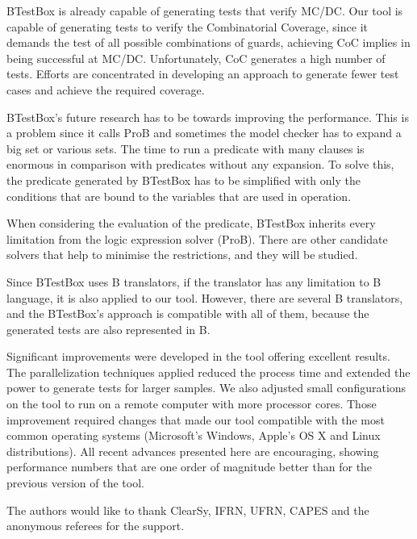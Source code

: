 \documentclass[runningheads]{llncs}
\begin{document}
BTestBox is already capable of generating tests that verify MC/DC. Our tool is capable of generating tests to verify the Combinatorial Coverage, since it demands the test of all possible combinations of guards, achieving CoC implies in being successful at MC/DC. Unfortunately, CoC generates a high number of tests. Efforts are concentrated in developing an approach to generate fewer test cases and achieve the required coverage.

BTestBox's future research has to be towards improving the performance. This is a problem since it calls ProB and sometimes the model checker has to expand a big set or various sets. The time to run a predicate with many clauses is enormous in comparison with predicates without any expansion. To solve this, the predicate generated by BTestBox has to be simplified with only the conditions that are bound to the variables that are used in operation.

When considering the evaluation of the predicate, BTestBox inherits every limitation from the logic expression solver (ProB). There are other candidate solvers that help to minimise the restrictions, and they will be studied.

Since BTestBox uses B translators, if the translator has any limitation to B language, it is also applied to our tool. However, there are several B translators, and the BTestBox's approach is compatible with all of them, because the generated tests are also represented in B. 

Significant improvements were developed in the tool offering excellent results.
The parallelization techniques applied reduced the process time and extended the power to generate tests for larger samples. We also adjusted small configurations on the tool to run on a remote computer with more processor cores. Those improvement required changes that made our tool compatible with the most common operating systems (Microsoft’s Windows, Apple’s OS X and Linux distributions). All recent advances presented here are encouraging, showing performance numbers that are one order of magnitude better than for the previous version of the tool.

The authors would like to thank ClearSy, IFRN, UFRN, CAPES and the anonymous referees for the support.




%
%
%




 
\end{document}
